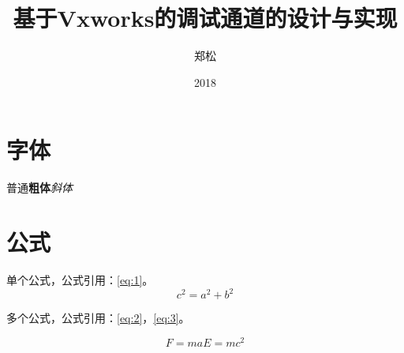 \documentclass[format=draft,language=chinese,degree=master]{hustthesis}
\title{基于Vxworks的调试通道的设计与实现}{A design and implementation of debug channel based on Vxworks.}
\author{郑松}{Joe}
\date{2018}{3}{26}
\begin{document}
\frontmatter

\maketitle

\makeabstract

\tableofcontents


\mainmatter
\clearpage



\clearpage



\section{字体}

普通\textbf{粗体}\emph{斜体}


\section{公式}

单个公式，公式引用：\autoref{eq:1}。
\begin{equation}
 c^2 = a^2 + b^2 \label{eq:1}
\end{equation}

多个公式，公式引用：\autoref{eq:2}，\autoref{eq:3}。

\begin{subequations}
\begin{equation}
  F = ma \label{eq:2}
\end{equation}
\begin{equation}
  E = mc^2 \label{eq:3}
\end{equation}
\end{subequations}
\end{document}
